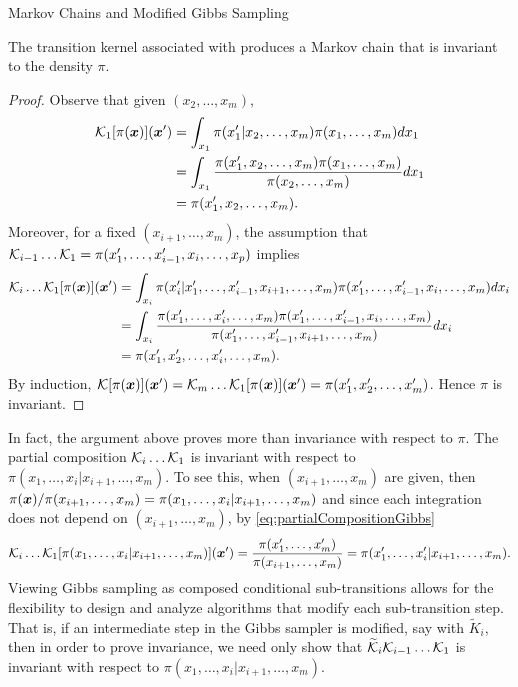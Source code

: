 \begin{chapter}{Markov Chains and Modified Gibbs Sampling}
\begin{prop} The transition kernel associated with  produces a Markov chain that is invariant to the density $\pi$.
\end{prop}
\begin{proof}
  Observe that given $(x_2,\dots,x_m)$,
  \begin{align}
    \mathcal K_1[\pi(\mbox{\boldmath$x$})](\mbox{\boldmath$x$}') 
      &=\int_{x_1} \pi(x_1'|x_2,\dots,x_m) \pi(x_1,\dots,x_m)dx_1\nonumber\\
      &=\int_{x_1} \frac{\pi(x_1',x_2,\dots,x_m) \pi(x_1,\dots,x_m)}{\pi(x_2,\dots,x_m)}dx_1\nonumber\\
      &=\pi(x_1',x_2,\dots,x_m).
  \end{align}
  Moreover, for a fixed $(x_{i+1},\dots,x_m)$, the assumption that $\mathcal K_{i-1} \dots  \mathcal K_1 = \pi(x_1',\dots,x_{i-1}',x_i,\dots,x_p)$ implies
  \begin{align}
    \mathcal K_i \dots  \mathcal K_1[\pi(\mbox{\boldmath$x$})](\mbox{\boldmath$x$}') 
      &=\int_{x_i} \pi(x_i'|x_1',\dots,x_{i-1}',x_{i+1},\dots,x_m) \pi(x_1',\dots,x_{i-1}',x_i,\dots,x_m)dx_i\nonumber\\
      &=\int_{x_i} \frac{\pi(x_1',\dots,x_{i}',\dots,x_m) \pi(x_1',\dots,x_{i-1}',x_i,\dots,x_m)}{\pi(x_1',\dots,x_{i-1}',x_{i+1},\dots,x_m)}dx_i\nonumber\\
      &=\pi(x_1',x_2',\dots,x_i',\dots,x_m).\label{eq:partialCompositionGibbs}
  \end{align}
  By induction, $\mathcal K [\pi(\mbox{\boldmath$x$})](\mbox{\boldmath$x$}') = \mathcal K_m\dots \mathcal K_1 [\pi(\mbox{\boldmath$x$})](\mbox{\boldmath$x$}') = \pi(x_1',x_2',\dots,x_m')$.
  Hence $\pi$ is invariant.
\end{proof}
In fact, the argument above proves more than invariance with respect to $\pi$.
The partial composition $\mathcal K_i\dots\mathcal K_1$ is invariant with respect to $\pi(x_1,\dots,x_i|x_{i+1},\dots,x_m)$. 
To see this, when $(x_{i+1},\dots,x_m)$ are given, then $\pi(\mbox{\boldmath$x$})/\pi(x_{i+1},\dots,x_m)= \pi(x_1,\dots,x_{i}|x_{i+1},\dots,x_m)$ and since each integration does not depend on $(x_{i+1},\dots,x_m)$, by \eqref{eq:partialCompositionGibbs}
\begin{equation} \label{eq:conditionalInvariance}
  \mathcal K_i\dots \mathcal K_1 [\pi(x_1,\dots,x_i|x_{i+1},\dots,x_m)](\mbox{\boldmath$x$}') 
  = \frac{\pi(x_1',\dots,x_m')}{\pi(x_{i+1},\dots,x_m)} = \pi(x_1',\dots,x_i'|x_{i+1},\dots,x_m).
\end{equation}
Viewing Gibbs sampling as composed conditional sub-transitions allows for the flexibility to design and analyze algorithms that modify each sub-transition step. 
That is, if an intermediate step in the Gibbs sampler is modified, say with $\tilde K_i$, then in order to prove invariance, we need only show that $\widetilde {\mathcal K}_i\mathcal K_{i-1}\dots\mathcal K_1$ is invariant with respect to $\pi(x_1,\dots,x_i|x_{i+1},\dots,x_m)$.

\end{chapter}
